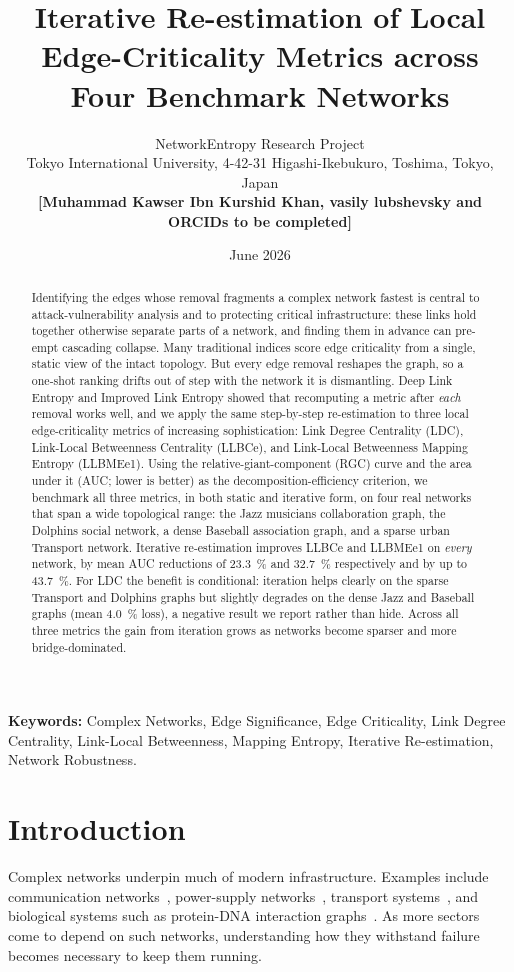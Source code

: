 \documentclass[runningheads,11pt]{article}
\title{Iterative Re-estimation of Local Edge-Criticality Metrics
across Four Benchmark Networks}
\author{NetworkEntropy Research Project\\
\small Tokyo International University, 4-42-31 Higashi-Ikebukuro,
Toshima, Tokyo, Japan\\
\small \textbf{[Muhammad Kawser Ibn Kurshid Khan, vasily lubshevsky and ORCIDs to be completed]}}
\date{June 2026}
\begin{document}
\maketitle

\begin{abstract}
Identifying the edges whose removal fragments a complex network fastest is
central to attack-vulnerability analysis and to protecting critical
infrastructure: these links hold together otherwise separate parts of a network,
and finding them in advance can pre-empt cascading collapse. Many traditional indices
score edge criticality from a single, static view of the intact topology. But
every edge removal reshapes the graph, so a one-shot ranking drifts out of step
with the network it is dismantling. Deep Link Entropy and Improved Link Entropy
showed that recomputing a metric after \emph{each} removal works well, and we
apply the same step-by-step re-estimation to three local edge-criticality metrics
of increasing sophistication: Link Degree Centrality (LDC), Link-Local
Betweenness Centrality (LLBCe), and Link-Local Betweenness Mapping Entropy
(LLBMEe1). Using the relative-giant-component (RGC) curve and the area under it
(AUC; lower is better) as the decomposition-efficiency criterion, we benchmark
all three metrics, in both static and iterative form, on four real networks that
span a wide topological range: the Jazz musicians collaboration graph, the
Dolphins social network, a dense Baseball association graph, and a sparse urban
Transport network. Iterative re-estimation improves LLBCe and LLBMEe1 on
\emph{every} network, by mean AUC reductions of \SI{23.3}{\percent} and
\SI{32.7}{\percent} respectively and by up to \SI{43.7}{\percent}. For LDC the
benefit is conditional: iteration helps clearly on the sparse Transport and
Dolphins graphs but slightly degrades on the dense Jazz and Baseball graphs
(mean \SI{4.0}{\percent} loss), a negative result we report rather than hide.
Across all three metrics the gain from iteration grows as networks become
sparser and more bridge-dominated.
\end{abstract}

\noindent\textbf{Keywords:} Complex Networks, Edge Significance, Edge
Criticality, Link Degree Centrality, Link-Local Betweenness, Mapping Entropy,
Iterative Re-estimation, Network Robustness.

\section{Introduction}
\label{sec:intro}
Complex networks underpin much of modern infrastructure. Examples include
communication networks~\cite{onnela2007structure}, power-supply
networks~\cite{wang2017identification}, transport
systems~\cite{ghosh2011railway}, and biological systems such as protein-DNA
interaction graphs~\cite{newman2003structure}. As more sectors come to depend on
such networks, understanding how they withstand failure becomes necessary to
keep them running.
\end{document}

